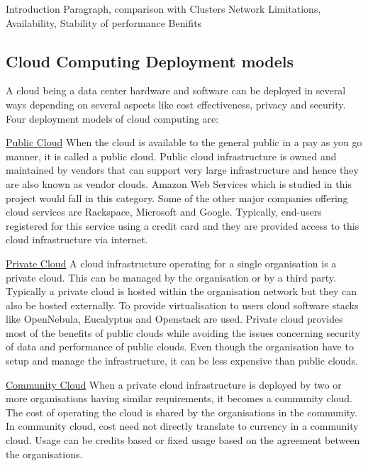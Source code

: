 \documentclass[12pt,a4paper]{report}
\begin{document}
Introduction Paragraph, comparison with Clusters 
Network Limitations, Availability, Stability of performance  
Benifits  

\subsection{Cloud Computing Deployment models}  
A cloud being a data center hardware and software can be deployed in several ways depending on several aspects like cost effectiveness, privacy and security.
Four deployment models of cloud computing are: 

\underline{ Public Cloud}  
When the cloud is available to the general public in a pay as you go manner, it is called a public cloud. 
Public cloud infrastructure is owned and maintained by vendors that can support very large infrastructure and hence they are also known as vendor clouds. 
Amazon Web Services\cite{} which is studied in this project would fall in this category. 
Some of the other major companies offering cloud services are Rackspace\cite{}, Microsoft\cite{} and Google\cite{}. 
Typically, end-users registered for this service using a credit card and they are provided access to this cloud infrastructure via internet.  

\underline{Private Cloud}  
A cloud infrastructure operating for a single organisation is a private cloud. This can be managed by the organisation or by a third party. 
Typically a private cloud is hosted within the organisation network but they can also be hosted externally. 
To provide virtualisation to users cloud software stacks like OpenNebula\cite{}, Eucalyptus\cite{} and Openstack\cite{} are used. 
Private cloud provides most of the benefits of public clouds while avoiding the issues concerning security of data and performance of public clouds. 
Even though the organisation have to setup and manage the infrastructure,  it can be less expensive than public clouds\cite{Magellan_Final_Report.pdf}.

\underline{Community Cloud}
When a private cloud infrastructure is deployed by two or more organisations having similar requirements, it becomes a community cloud. 
The cost of operating the cloud is shared by the organisations in the community. 
In community cloud, cost need not directly translate to currency in a community cloud.
Usage can be credits based or fixed usage based on the agreement between the organisations.
\end{document}
